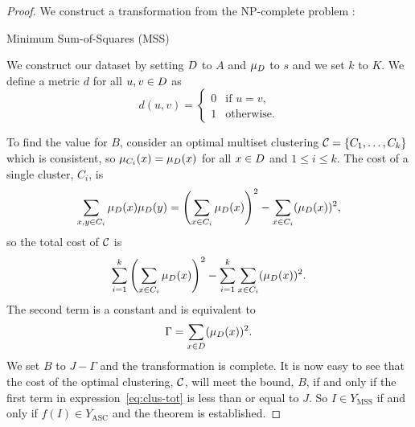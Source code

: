 \begin{proof}
  We construct a transformation from the NP-complete problem
  \citep{gareyjohnson79}:
  \begin{problem}{Minimum Sum-of-Squares (MSS)}
  \end{problem}
  We construct our dataset by setting $D$ to $A$ and $\mu_{D}$ to $s$
  and we set $k$ to $K$.  We define a metric $d$ for all $u,v \in D$ as
  \begin{equation*}
    d(u,v) =
    \begin{cases}
      0 & \text{if $u=v$,}\\
      1 & \text{otherwise.}
    \end{cases}
  \end{equation*}

  To find the value for $B$, consider an optimal multiset clustering
  $\mathcal{C}=\{C_1,\dotsc,C_k\}$ which is consistent, so
  $\mu_{C_i}(x)=\mu_{D}(x)$ for all $x \in D$ and $1 \leq i \leq k$.
  The cost of a single cluster, $C_i$, is
  \begin{equation*}
    \sum_{x,y \in C_i} \mu_{D}(x)\mu_{D}(y)
    = \left(\sum_{x \in C_i} \mu_{D}(x)\right)^2
    - \sum_{x \in C_i} (\mu_{D}(x))^2,
  \end{equation*}
  so the total cost of $\mathcal{C}$ is
  \begin{equation}
    \label{eq:clus-tot}
    \sum_{i=1}^{k}\left(\sum_{x \in C_i} \mu_{D}(x)\right)^2
    - \sum_{i=1}^{k}\sum_{x \in C_i} (\mu_{D}(x))^2.
  \end{equation}
  The second term is a constant and is equivalent to
  \begin{equation*}
    \Gamma = \sum_{x \in D} (\mu_{D}(x))^2.
  \end{equation*}
  We set $B$ to $J-\Gamma$ and the transformation is complete.  It is now easy
  to see that the cost of the optimal clustering, $\mathcal{C}$, will meet the
  bound, $B$, if and only if the first term in expression~\eqref{eq:clus-tot}
  is less than or equal to $J$.  So $I \in Y_{\text{MSS}}$ if and only if
  $f(I) \in Y_{\text{ASC}}$ and the theorem is established.
\end{proof}

